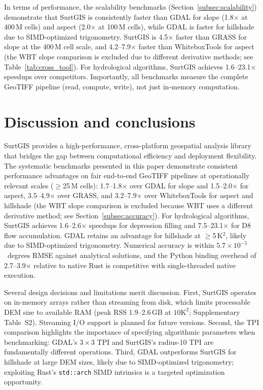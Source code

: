 \documentclass[preprint,review,12pt,authoryear]{elsarticle}
\begin{document}
In terms of performance, the scalability benchmarks (Section~\ref{subsec:scalability}) demonstrate that SurtGIS is consistently faster than GDAL for slope (1.8$\times$ at 400\,M cells) and aspect (2.0$\times$ at 100\,M cells), while GDAL is faster for hillshade due to SIMD-optimized trigonometry. SurtGIS is 4.5$\times$ faster than GRASS for slope at the 400\,M cell scale, and 4.2--7.9$\times$ faster than WhiteboxTools for aspect (the WBT slope comparison is excluded due to different derivative methods; see Table~\ref{tab:cross_tool}). For hydrological algorithms, SurtGIS achieves 1.6--23.1$\times$ speedups over competitors. Importantly, all benchmarks measure the complete GeoTIFF pipeline (read, compute, write), not just in-memory computation.

\section{Discussion and conclusions}
\label{sec:conclusions}

SurtGIS provides a high-performance, cross-platform geospatial analysis library that bridges the gap between computational efficiency and deployment flexibility. The systematic benchmarks presented in this paper demonstrate consistent performance advantages on fair end-to-end GeoTIFF pipelines at operationally relevant scales ($\geq$25\,M cells): 1.7--1.8$\times$ over GDAL for slope and 1.5--2.0$\times$ for aspect, 3.5--4.9$\times$ over GRASS, and 3.2--7.9$\times$ over WhiteboxTools for aspect and hillshade (the WBT slope comparison is excluded because WBT uses a different derivative method; see Section~\ref{subsec:accuracy}). For hydrological algorithms, SurtGIS achieves 1.6--2.6$\times$ speedups for depression filling and 7.5--23.1$\times$ for D8 flow accumulation. GDAL retains an advantage for hillshade at $\geq$5\,K$^2$, likely due to SIMD-optimized trigonometry. Numerical accuracy is within $5.7 \times 10^{-5}$~degrees RMSE against analytical solutions, and the Python binding overhead of 2.7--3.9$\times$ relative to native Rust is competitive with single-threaded native execution.

Several design decisions and limitations merit discussion. First, SurtGIS operates on in-memory arrays rather than streaming from disk, which limits processable DEM size to available RAM (peak RSS 1.9--2.6\,GB at $10\text{K}^2$; Supplementary Table~S2). Streaming I/O support is planned for future versions. Second, the TPI comparison highlights the importance of specifying algorithmic parameters when benchmarking: GDAL's $3 \times 3$ TPI and SurtGIS's radius-10 TPI are fundamentally different operations. Third, GDAL outperforms SurtGIS for hillshade at large DEM sizes, likely due to SIMD-optimized trigonometry; exploiting Rust's \texttt{std::arch} SIMD intrinsics is a targeted optimization opportunity.
\end{document}
